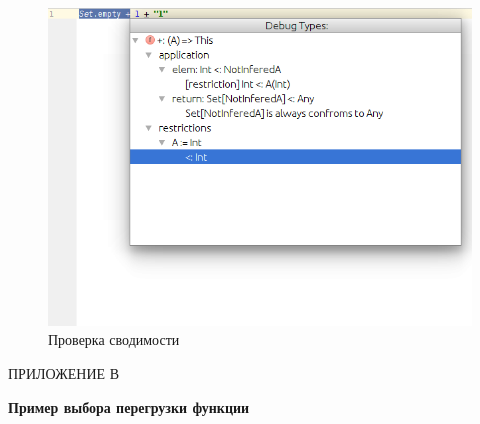 \begin{figure}[h!]
\begin{minipage}{.5\linewidth}
  \end{minipage}\par\medskip
  \centering
  \includegraphics[scale=.7]{img/infer2}

  \caption{Проверка сводимости}
  \label{fig:infer}
\end{figure}


\vfill
\clearpage
\newpage


\vfill
\clearpage
\appendix

\hfill ПРИЛОЖЕНИЕ В
\begin{center}
  \textbf{Пример выбора перегрузки функции}
\end{center}
\markboth{\MakeUppercase{}}{}

